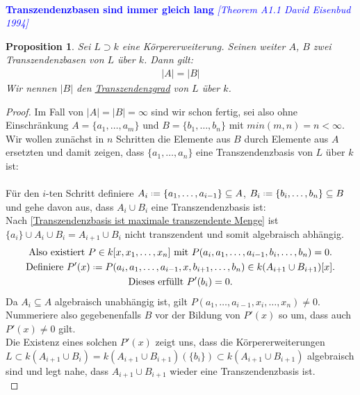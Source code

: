 \documentclass[10pt,a4paper]{report}
\newcommand{\comment}[1]{}
\newcommand{\ModulsOfDifferenzials}{David Eisenbud 1994}
\newcounter{Aussage}[chapter]
\newtheorem{prop}[Aussage]{Proposition}
\newcommand*{\defeq}{\mathrel{\vcenter{\baselineskip0.5ex \lineskiplimit0pt
                     \hbox{\scriptsize.}\hbox{\scriptsize.}}}%
                     =}
\begin{document}
\ \\
\textcolor{blue}{\textbf{Transzendenzbasen sind immer gleich lang} \textit{[Theorem A1.1 \ModulsOfDifferenzials]}}
\begin{prop}\comment{\label{Transzendenzbasen sind immer gleich lang}}
Sei $L \supset k$ eine Körpererweiterung. Seinen weiter $A$, $B$ zwei Transzendenzbasen von $L$ über $k$. Dann gilt:
\begin{gather*}
\vert A \vert = \vert B \vert
\end{gather*}
Wir nennen $\vert B \vert$ den \underline{Transzendenzgrad} von $L$ über $k$.
\end{prop}
\begin{proof}
Im Fall von $\vert A \vert = \vert B \vert = \infty$ sind wir schon fertig, sei also ohne Einschränkung $A = \lbrace a_1, \dots , a_m \rbrace$ und $B = \lbrace b_1, \dots , b_n \rbrace$ mit $min(m,n) = n < \infty$.\\
Wir wollen zunächst in $n$ Schritten die Elemente aus $B$ durch Elemente aus $A$ ersetzten und damit zeigen, dass $\lbrace a_1, \dots , a_n \rbrace$ eine Transzendenzbasis von $L$ über $k$ ist:\\
\ \\
Für den $i$-ten Schritt definiere $A_i \defeq \lbrace a_1,\dots,a_{i-1} \rbrace \subseteq A$, $B_i \defeq \lbrace b_i,\dots,b_n \rbrace \subseteq B$ und gehe davon aus, dass $A_i \cup B_i$ eine Transzendenzbasis ist:\\
Nach \cref{Transzendenzbasis ist maximale transzendente Menge} ist $\lbrace a_i \rbrace \cup A_{i} \cup B_{i} = A_{i+1} \cup B_{i}$ nicht transzendent und somit algebraisch abhängig.
\begin{gather*}
\text{Also existiert } P \in k[x,x_1,\dots,x_n] \text{ mit } P(a_i,a_1,\dots,a_{i-1},b_i,\dots,b_n) = 0. \\
\text{Definiere } P'(x) \defeq P(a_i,a_1,\dots,a_{i-1},x,b_{i+1},\dots,b_n) \in k(A_{i+1} \cup B_{i+1})[x].\\
\text{Dieses erfüllt } P'(b_i) = 0.
\end{gather*}
Da $A_i \subseteq A$ algebraisch unabhängig ist, gilt $P(a_1,\dots,a_{i-1},x_i,\dots,x_n) \neq 0$. Nummeriere also gegebenenfalls $B$ vor der Bildung von $P'(x)$ so um, dass auch $P'(x) \neq 0$ gilt.\\
Die Existenz eines solchen $P'(x)$ zeigt uns, dass die Körpererweiterungen \\$L \subset k(A_{i+1} \cup B_i) = k(A_{i+1} \cup B_{i+1})(\lbrace b_i \rbrace) \subset k(A_{i+1} \cup B_{i+1})$ algebraisch sind und legt nahe, dass $A_{i+1} \cup B_{i+1}$ wieder eine Transzendenzbasis ist.\\

\end{proof}
\end{document}
